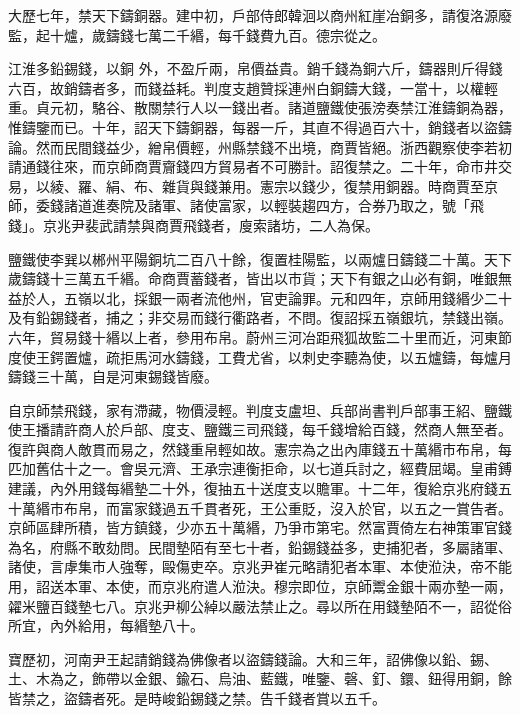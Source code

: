 \begin{pinyinscope}
 大歷七年，禁天下鑄銅器。建中初，戶部侍郎韓洄以商州紅崖冶銅多，請復洛源廢監，起十爐，歲鑄錢七萬二千緡，每千錢費九百。德宗從之。


江淮多鉛錫錢，以銅
 外，不盈斤兩，帛價益貴。銷千錢為銅六斤，鑄器則斤得錢六百，故銷鑄者多，而錢益耗。判度支趙贊採連州白銅鑄大錢，一當十，以權輕重。貞元初，駱谷、散關禁行人以一錢出者。諸道鹽鐵使張滂奏禁江淮鑄銅為器，惟鑄鑒而已。十年，詔天下鑄銅器，每器一斤，其直不得過百六十，銷錢者以盜鑄論。然而民間錢益少，繒帛價輕，州縣禁錢不出境，商賈皆絕。浙西觀察使李若初請通錢往來，而京師商賈齎錢四方貿易者不可勝計。詔復禁之。二十年，命市井交易，以綾、羅、絹、布、雜貨與錢兼用。憲宗以錢少，復禁用銅器。時商賈至京師，委錢諸道進奏院及諸軍、諸使富家，以輕裝趨四方，合券乃取之，號「飛錢」。京兆尹裴武請禁與商賈飛錢者，廋索諸坊，二人為保。



 鹽鐵使李巽以郴州平陽銅坑二百八十餘，復置桂陽監，以兩爐日鑄錢二十萬。天下歲鑄錢十三萬五千緡。命商賈蓄錢者，皆出以市貨；天下有銀之山必有銅，唯銀無益於人，五嶺以北，採銀一兩者流他州，官吏論罪。元和四年，京師用錢緡少二十及有鉛錫錢者，捕之；非交易而錢行衢路者，不問。復詔採五嶺銀坑，禁錢出嶺。六年，貿易錢十緡以上者，參用布帛。蔚州三河冶距飛狐故監二十里而近，河東節度使王鍔置爐，疏拒馬河水鑄錢，工費尤省，以刺史李聽為使，以五爐鑄，每爐月鑄錢三十萬，自是河東錫錢皆廢。



 自京師禁飛錢，家有滯藏，物價浸輕。判度支盧坦、兵部尚書判戶部事王紹、鹽鐵使王播請許商人於戶部、度支、鹽鐵三司飛錢，每千錢增給百錢，然商人無至者。復許與商人敵貫而易之，然錢重帛輕如故。憲宗為之出內庫錢五十萬緡市布帛，每匹加舊估十之一。會吳元濟、王承宗連衡拒命，以七道兵討之，經費屈竭。皇甫鎛建議，內外用錢每緡墊二十外，復抽五十送度支以贍軍。十二年，復給京兆府錢五十萬緡市布帛，而富家錢過五千貫者死，王公重貶，沒入於官，以五之一賞告者。京師區肆所積，皆方鎮錢，少亦五十萬緡，乃爭市第宅。然富賈倚左右神策軍官錢為名，府縣不敢劾問。民間墊陌有至七十者，鉛錫錢益多，吏捕犯者，多屬諸軍、諸使，言虖集市人強奪，毆傷吏卒。京兆尹崔元略請犯者本軍、本使涖決，帝不能用，詔送本軍、本使，而京兆府遣人涖決。穆宗即位，京師鬻金銀十兩亦墊一兩，糴米鹽百錢墊七八。京兆尹柳公綽以嚴法禁止之。尋以所在用錢墊陌不一，詔從俗所宜，內外給用，每緡墊八十。



 寶歷初，河南尹王起請銷錢為佛像者以盜鑄錢論。大和三年，詔佛像以鉛、錫、土、木為之，飾帶以金銀、鍮石、烏油、藍鐵，唯鑒、磬、釘、鐶、鈕得用銅，餘皆禁之，盜鑄者死。是時峻鉛錫錢之禁。告千錢者賞以五千。




\end{pinyinscope}
